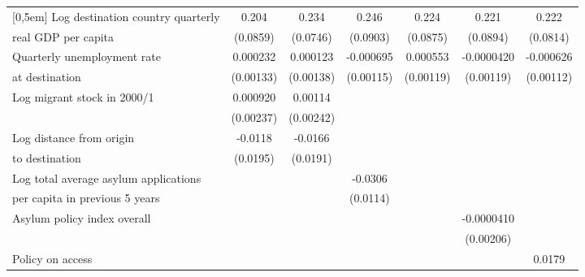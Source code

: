 \begin{table}[!ht]
\begin{tabular}{l*{6}{c}}
[0,5em]
Log destination country quarterly &       0.204\sym{*}  &       0.234\sym{**} &       0.246\sym{**} &       0.224\sym{*}  &       0.221\sym{*}  &       0.222\sym{**} \\
real GDP per capita                    &    (0.0859)         &    (0.0746)         &    (0.0903)         &    (0.0875)         &    (0.0894)         &    (0.0814)         \\
[0,5em]
Quarterly unemployment rate&    0.000232         &    0.000123         &   -0.000695         &    0.000553         &  -0.0000420         &   -0.000626         \\
 at destination                    &   (0.00133)         &   (0.00138)         &   (0.00115)         &   (0.00119)         &   (0.00119)         &   (0.00112)         \\
[0,5em]
Log migrant stock in 2000/1&    0.000920         &     0.00114         &                     &                     &                     &                     \\
                    &   (0.00237)         &   (0.00242)         &                     &                     &                     &                     \\
[0,5em]
Log distance from origin &     -0.0118         &     -0.0166         &                     &                     &                     &                     \\
to destination                    &    (0.0195)         &    (0.0191)         &                     &                     &                     &                     \\
[0,5em]
Log total average asylum applications &                     &                     &     -0.0306\sym{**} &                     &                     &                     \\
per capita in previous 5 years                    &                     &                     &    (0.0114)         &                     &                     &                     \\
[0,5em]
Asylum policy index overall&                     &                     &                     &                     &  -0.0000410         &                     \\
                    &                     &                     &                     &                     &   (0.00206)         &                     \\
[0,5em]
Policy on access    &                     &                     &                     &                     &                     &      0.0179\sym{**} \\

\end{tabular}
\end{table}
